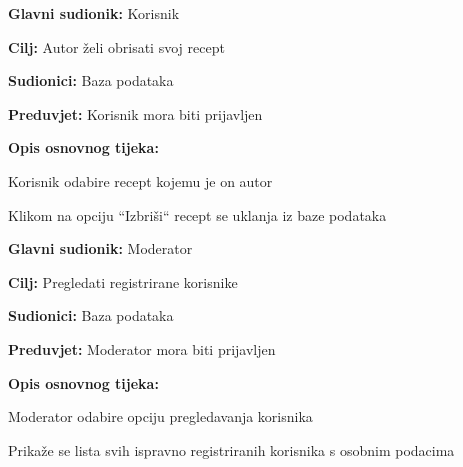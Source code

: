 \noindent {}
\begin{packed_item}

	\item \textbf{Glavni sudionik: } Korisnik
	\item  \textbf{Cilj:} Autor želi obrisati svoj recept
	\item  \textbf{Sudionici:} Baza podataka
	\item  \textbf{Preduvjet:} Korisnik mora biti prijavljen
	\item  \textbf{Opis osnovnog tijeka:}

	\item[] \begin{packed_enum}

		\item Korisnik odabire recept kojemu je on autor
		\item Klikom na opciju “Izbriši“ recept se uklanja iz baze podataka
	\end{packed_enum}
\end{packed_item}

\noindent {}
\begin{packed_item}

	\item \textbf{Glavni sudionik: } Moderator
	\item  \textbf{Cilj:} Pregledati registrirane korisnike
	\item  \textbf{Sudionici:} Baza podataka
	\item  \textbf{Preduvjet:} Moderator mora biti prijavljen
	\item  \textbf{Opis osnovnog tijeka:}

	\item[] \begin{packed_enum}

		\item Moderator odabire opciju pregledavanja korisnika
		\item Prikaže se lista svih ispravno registriranih korisnika s osobnim podacima
	\end{packed_enum}
\end{packed_item}

